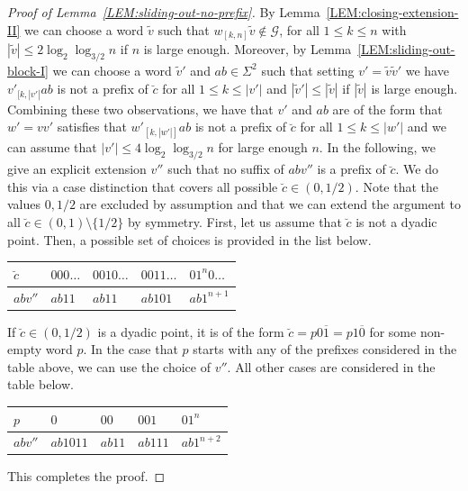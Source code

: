 \documentclass[11pt,reqno]{amsart}
\theoremstyle{plain}
\theoremstyle{definition}
\newcommand{\mc}{\mathcal}
\begin{document}
\begin{proof}[Proof of Lemma~\ref{LEM:sliding-out-no-prefix}]
By Lemma~\ref{LEM:closing-extension-II} 
we can choose a word $\widetilde{v}$ such that $w_{[k,n]}\widetilde{v}\notin \mc G$, for all $1\leqslant k\leqslant n$ with $|\widetilde{v}|\leqslant 2\log_2\log_{3/2} n$ if $n$ is large enough. Moreover, by Lemma~\ref{LEM:sliding-out-block-I} we can choose a word $\widetilde{v}'$ and $ab \in \Sigma^2$ such that setting $v'=\widetilde{v}\widetilde{v}'$ we have 
$v'_{[k,|v'|}ab$ is not a prefix of $\breve{c}$ for all $1\leqslant k\leqslant |v'|$ and
$|\widetilde{v}'|\leqslant |\widetilde{v}|$ if $|\widetilde{v}|$ is large enough.
Combining these two observations, we have that $v'$ and $ab$ are of the form that
$w'=vv'$ satisfies that $w'_{[k,|w'|]}ab$ is not a prefix of $\breve{c}$ for all $1\leq k\leq |w'|$ and we can assume that $|v'| \leqslant 4 \log_2 \log_{3/2}n$ for large enough $n$.
In the following, we give an explicit extension $v''$ such that no suffix of $abv''$ is a prefix of $\breve{c}$. We do this via a case distinction that covers all possible $\breve{c} \in (0,1/2)$. Note that the values $0,1/2$ are excluded by assumption and that we can extend the argument to all $\breve{c} \in (0,1)\setminus\{1/2\}$ by symmetry.
First, let us assume that $\breve{c}$ is not a dyadic point. Then, a possible set of choices is provided in the list below.

\begin{center}
    \begin{tabular}{ | l | l | l | l | l |}
    \hline
    $\breve{c}$ & $000\ldots$ & $0010\ldots$ & $0011\ldots$ & $01^n0\ldots$  \\ \hline
    $abv''$ & $ab11$ & $ab11$ &  $ab101$ & $ab1^{n+1}$  \\ 
    \hline
    \end{tabular}
\end{center}
If $\breve{c} \in (0,1/2)$ is a dyadic point, it is of the form $\breve{c} = p 0\overline{1} = p 1\overline{0}$ for some non-empty word $p$. In the case that $p$ starts with any of the prefixes considered in the table above, we can use the choice of $v''$. All other cases are considered in the table below.

\begin{center}
    \begin{tabular}{ | l | l | l | l | l |}
    \hline
    $p$ & $0$ & $00$ & $001$ & $01^n$  \\ \hline
    $abv''$ & $ab1011$ & $ab11$ &  $ab111$ & $ab1^{n+2}$  \\ 
    \hline
    \end{tabular}
\end{center}
This completes the proof.
\end{proof}
\end{document}
